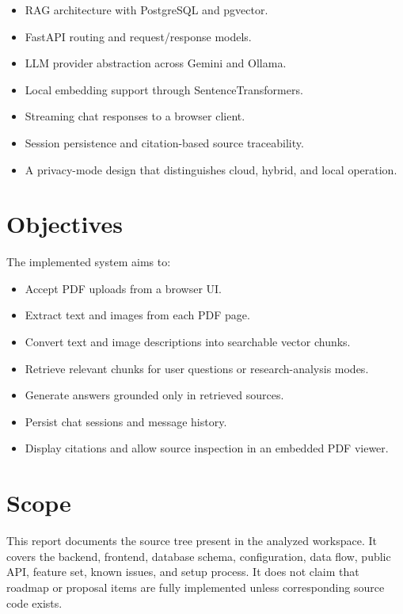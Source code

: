 \documentclass[11pt,a4paper]{report}
\begin{document}
\begin{itemize}[leftmargin=*]
    \item RAG architecture with PostgreSQL and pgvector.
    \item FastAPI routing and request/response models.
    \item LLM provider abstraction across Gemini and Ollama.
    \item Local embedding support through SentenceTransformers.
    \item Streaming chat responses to a browser client.
    \item Session persistence and citation-based source traceability.
    \item A privacy-mode design that distinguishes cloud, hybrid, and local operation.
\end{itemize}

\section{Objectives}

The implemented system aims to:

\begin{itemize}[leftmargin=*]
    \item Accept PDF uploads from a browser UI.
    \item Extract text and images from each PDF page.
    \item Convert text and image descriptions into searchable vector chunks.
    \item Retrieve relevant chunks for user questions or research-analysis modes.
    \item Generate answers grounded only in retrieved sources.
    \item Persist chat sessions and message history.
    \item Display citations and allow source inspection in an embedded PDF viewer.
\end{itemize}

\section{Scope}

This report documents the source tree present in the analyzed workspace. It covers the backend, frontend, database schema, configuration, data flow, public API, feature set, known issues, and setup process. It does not claim that roadmap or proposal items are fully implemented unless corresponding source code exists.
\end{document}
